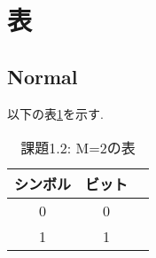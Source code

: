 \documentclass{jsarticle}           %
\theoremstyle{plain}
\theoremstyle{definition}
\theoremstyle{remark}
\begin{document}
\section{表}
\subsection{Normal}
以下の表\ref{課題1.2: M=2の表}を示す.
\begin{table}[H]  %
  \caption[M=2]{課題1.2: M=2の表}
  \label{課題1.2: M=2の表}
  \begin{center}
    \setlength{\tabcolsep}{3pt}
    \footnotesize
    \begin{tabular}{|c|c|c} \hline
      シンボル & ビット \\ \hline \hline
      0            & 0         \\ \hline
      1            & 1         \\ \hline
    \end{tabular}
  \end{center}
\end{table}
        
\end{document}
